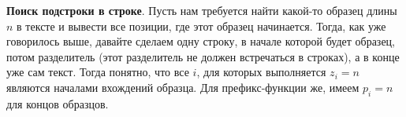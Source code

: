 \textbf{Поиск подстроки в строке}. Пусть нам требуется найти какой-то образец длины $n$ в тексте и вывести все позиции, где этот образец начинается. Тогда, как уже говорилось выше, давайте сделаем одну строку, в начале которой будет образец, потом разделитель (этот разделитель не должен встречаться в строках), а в конце уже сам текст. Тогда понятно, что все $i$, для которых выполняется $z_i = n$ являются началами вхождений образца. Для префикс-функции же, имеем $p_i = n$ для концов образцов.
